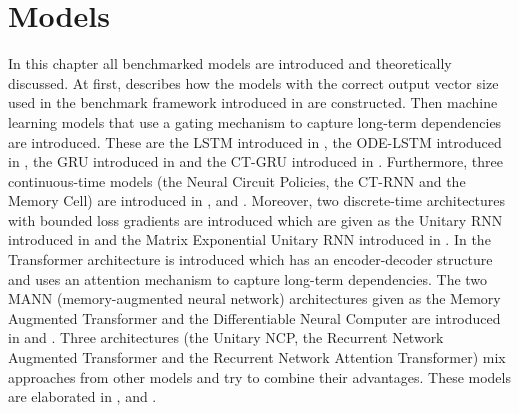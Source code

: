 \documentclass[draft,final]{vutinfth} %
\begin{document}
    \chapter{Models}
    In this chapter all benchmarked models are introduced and theoretically discussed.
    At first,  describes how the models with the correct output vector size used in the benchmark framework introduced in  are constructed.
    Then machine learning models that use a gating mechanism to capture long-term dependencies are introduced.
    These are the LSTM introduced in , the ODE-LSTM introduced in , the GRU introduced in  and the CT-GRU introduced in .
    Furthermore, three continuous-time models (the Neural Circuit Policies, the CT-RNN and the Memory Cell) are introduced in ,  and .
    Moreover, two discrete-time architectures with bounded loss gradients are introduced which are given as the Unitary RNN introduced in  and the Matrix Exponential Unitary RNN introduced in .
    In  the Transformer architecture is introduced which has an encoder-decoder structure and uses an attention mechanism to capture long-term dependencies.
    The two MANN (memory-augmented neural network) architectures given as the Memory Augmented Transformer and the Differentiable Neural Computer are introduced in  and .
    Three architectures (the Unitary NCP, the Recurrent Network Augmented Transformer and the Recurrent Network Attention Transformer) mix approaches from other models and try to combine their advantages.
    These models are elaborated in ,  and .
\end{document}
